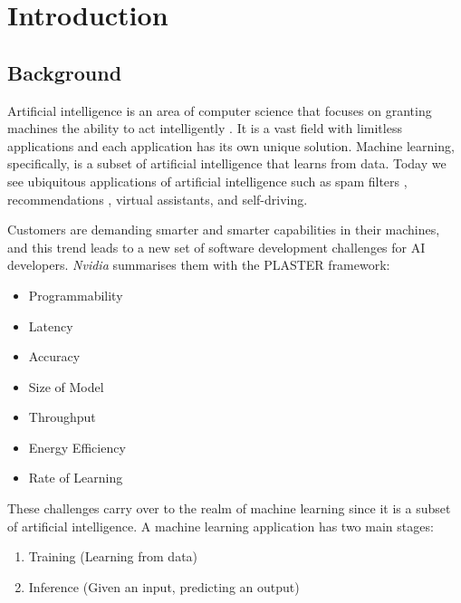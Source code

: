 \documentclass{report}
\def\mainmatter{%
    \pagenumbering{arabic}
    \setcounter{page}{1}
    \setcounter{section}{0}
    \renewcommand{\thesection}{\thechapter.\arabic{section}}
}%
\begin{document}
\newpage
{}
\listoffigures

\newpage
{}
\listoftables

\newpage
\mainmatter

\chapter{Introduction}

\section{Background}

Artificial intelligence is an area of computer science that focuses on granting machines the ability to act intelligently \cite{McCarthy2007}.
It is a vast field with limitless applications and each application has its own unique solution.
Machine learning, specifically, is a subset of artificial intelligence that learns from data. \cite{Mitchell1997}
Today we see ubiquitous applications of artificial intelligence such as spam filters \cite{Androutsopoulos2000},  recommendations \cite{lekakos2008hybrid}, virtual assistants, and self-driving.

Customers are demanding smarter and smarter capabilities in their machines, and this trend leads to a new set of software development challenges for AI developers. \textit{Nvidia} summarises them with the PLASTER \cite{Teich2018} framework:
\begin{itemize}
  \item Programmability
  \item Latency
  \item Accuracy
  \item Size of Model
  \item Throughput
  \item Energy Efficiency
  \item Rate of Learning
\end{itemize}

These challenges carry over to the realm of machine learning since it is a subset of artificial intelligence.
A machine learning application has two main stages:
\begin{enumerate}
  \item Training (Learning from data)
  \item Inference (Given an input, predicting an output)
\end{enumerate}
\end{document}
